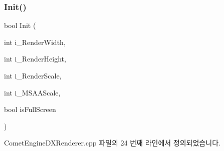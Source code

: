 \subsubsection{\texorpdfstring{Init()}{Init()}}
{\footnotesize\ttfamily bool Init (\begin{DoxyParamCaption}\item[{int}]{i\+\_\+\+Render\+Width,  }\item[{int}]{i\+\_\+\+Render\+Height,  }\item[{int}]{i\+\_\+\+Render\+Scale,  }\item[{int}]{i\+\_\+\+M\+S\+A\+A\+Scale,  }\item[{bool}]{is\+Full\+Screen }\end{DoxyParamCaption})}



Comet\+Engine\+D\+X\+Renderer.\+cpp 파일의 24 번째 라인에서 정의되었습니다.


